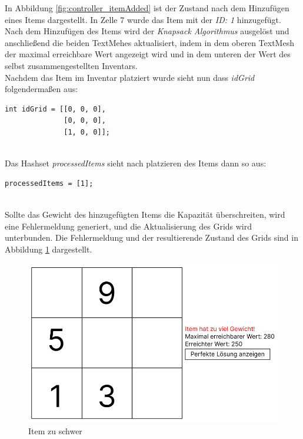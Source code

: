 In Abbildung \ref{fig:controller_itemAdded} ist der Zustand nach dem Hinzufügen eines Items dargestellt. In Zelle 7 wurde
das Item mit der \textit{ID: 1} hinzugefügt. Nach dem Hinzufügen des Items wird der \textit{Knapsack Algorithmus} ausgelöst
und anschließend die beiden TextMehes aktualisiert, indem in dem oberen TextMesh der maximal erreichbare Wert angezeigt wird
und in dem unteren der Wert des selbst zusammengestellten Inventars.\\

Nachdem das Item im Inventar platziert wurde sieht nun dass \textit{idGrid} folgendermaßen aus:
\begin{lstlisting}[style=csharp, caption={ID verspeichert}, label=code:controller_savedID]
int idGrid = [[0, 0, 0],
              [0, 0, 0],
              [1, 0, 0]];
\end{lstlisting}\\

Das Hashset \textit{processedItems} sieht nach platzieren des Items dann so aus:
\begin{lstlisting}[style=csharp, caption={ID verspeichert}, label=code:controller_savedID]
processedItems = [1];
\end{lstlisting}\\

Sollte das Gewicht des hinzugefügten Items die Kapazität überschreiten, wird eine Fehlermeldung generiert, und die
Aktualisierung des Grids wird unterbunden. Die Fehlermeldung und der resultierende Zustand des Grids sind in Abbildung
\ref{fig:controller_itemToHeavy} dargestellt.
\begin{figure}[h]
    \centering
    \includegraphics[scale=0.6]{images/itemToHeavy}
    \caption{Item zu schwer}
    \label{fig:controller_itemToHeavy}
\end{figure}

